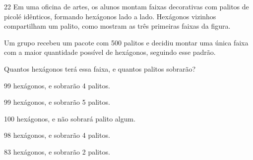 \begin{questaoinedita}{2}{2}
Em uma oficina de artes, os alunos montam faixas decorativas com palitos de
picolé idênticos, formando hexágonos lado a lado. Hexágonos vizinhos
compartilham um palito, como mostram as três primeiras faixas da figura.

\begin{center}
\end{center}

Um grupo recebeu um pacote com 500 palitos e decidiu montar uma única faixa com
a maior quantidade possível de hexágonos, seguindo esse padrão.

Quantos hexágonos terá essa faixa, e quantos palitos sobrarão?
\begin{alternativas}
  \item 99 hexágonos, e sobrarão 4 palitos.
  \item 99 hexágonos, e sobrarão 5 palitos.
  \item 100 hexágonos, e não sobrará palito algum.
  \item 98 hexágonos, e sobrarão 4 palitos.
  \item 83 hexágonos, e sobrarão 2 palitos.
\end{alternativas}
\end{questaoinedita}
